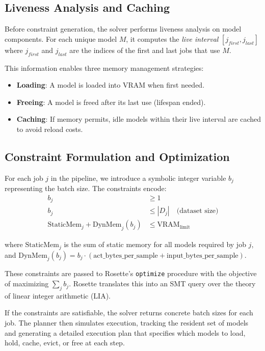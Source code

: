 \documentclass{nfr}
\begin{document}
\subsection{Liveness Analysis and Caching}
Before constraint generation, the solver performs liveness analysis on model components. For each unique model $M$, it computes the \emph{live interval} $[j_{first}, j_{last}]$ where $j_{first}$ and $j_{last}$ are the indices of the first and last jobs that use $M$.

This information enables three memory management strategies:
\begin{itemize}
    \item \textbf{Loading}: A model is loaded into VRAM when first needed.
    \item \textbf{Freeing}: A model is freed after its last use (lifespan ended).
    \item \textbf{Caching}: If memory permits, idle models within their live interval are cached to avoid reload costs.
\end{itemize}

\subsection{Constraint Formulation and Optimization}
For each job $j$ in the pipeline, we introduce a symbolic integer variable $b_j$ representing the batch size. The constraints encode:
\begin{align}
    b_j &\geq 1 \\
    b_j &\leq |D_j| \quad \text{(dataset size)} \\
    \text{StaticMem}_j + \text{DynMem}_j(b_j) &\leq \text{VRAM}_{\text{limit}}
\end{align}

where $\text{StaticMem}_j$ is the sum of static memory for all models required by job $j$, and $\text{DynMem}_j(b_j) = b_j \cdot (\text{act\_bytes\_per\_sample} + \text{input\_bytes\_per\_sample})$.

These constraints are passed to Rosette's \texttt{optimize} procedure with the objective of maximizing $\sum_j b_j$. Rosette translates this into an SMT query over the theory of linear integer arithmetic (LIA).

If the constraints are satisfiable, the solver returns concrete batch sizes for each job. The planner then simulates execution, tracking the resident set of models and generating a detailed execution plan that specifies which models to load, hold, cache, evict, or free at each step. 
\end{document}

